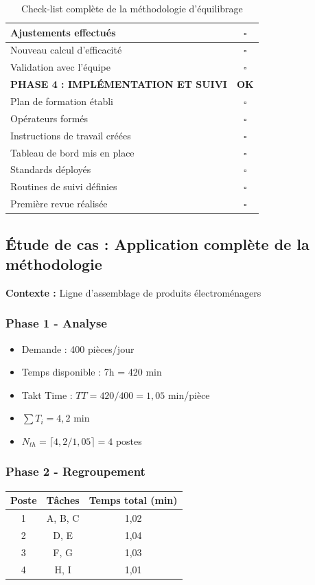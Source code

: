 \documentclass[12pt,a4paper]{article}
\begin{document}
\begin{table}[H]
\begin{tabular}{|p{10cm}|c|}
\hline
Ajustements effectués & $\square$ \\
\hline
Nouveau calcul d'efficacité & $\square$ \\
\hline
Validation avec l'équipe & $\square$ \\
\hline
\textbf{PHASE 4 : IMPLÉMENTATION ET SUIVI} & \textbf{OK} \\
\hline
Plan de formation établi & $\square$ \\
\hline
Opérateurs formés & $\square$ \\
\hline
Instructions de travail créées & $\square$ \\
\hline
Tableau de bord mis en place & $\square$ \\
\hline
Standards déployés & $\square$ \\
\hline
Routines de suivi définies & $\square$ \\
\hline
Première revue réalisée & $\square$ \\
\hline
\end{tabular}
\caption{Check-list complète de la méthodologie d'équilibrage}
\end{table}

\subsection{Étude de cas : Application complète de la méthodologie}

\textbf{Contexte :} Ligne d'assemblage de produits électroménagers

\subsubsection{Phase 1 - Analyse}
\begin{itemize}
    \item Demande : 400 pièces/jour
    \item Temps disponible : 7h = 420 min
    \item Takt Time : $TT = 420 / 400 = 1,05$ min/pièce
    \item $\sum T_i = 4,2$ min
    \item $N_{th} = \lceil 4,2 / 1,05 \rceil = 4$ postes
\end{itemize}

\subsubsection{Phase 2 - Regroupement}
\begin{table}[H]
\centering
\begin{tabular}{|c|c|c|}
\hline
\textbf{Poste} & \textbf{Tâches} & \textbf{Temps total (min)} \\
\hline
1 & A, B, C & 1,02 \\
\hline
2 & D, E & 1,04 \\
\hline
3 & F, G & 1,03 \\
\hline
4 & H, I & 1,01 \\
\hline
\end{tabular}
\end{table}
\end{document}
